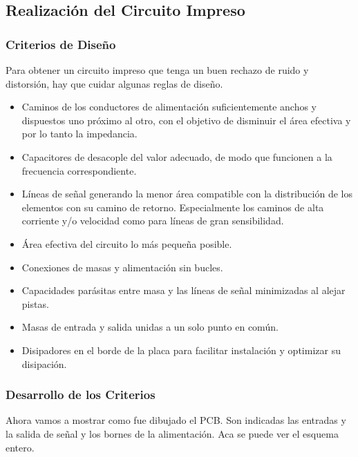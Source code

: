 \subsection{Realización del Circuito Impreso}
\bigskip 
\subsubsection{Criterios de Diseño}
Para obtener un circuito impreso que tenga un buen rechazo de ruido y distorsión, hay que cuidar algunas reglas de diseño.\\
\begin{itemize}
\bigskip 

\item  Caminos de los conductores de alimentación suficientemente anchos y  dispuestos uno próximo al otro, con el objetivo de disminuir el área efectiva y por lo tanto la impedancia.

\item Capacitores de desacople del valor adecuado, de modo que funcionen a la frecuencia correspondiente.

\item Líneas de señal generando la menor área compatible con la distribución de los elementos con su camino de retorno. Especialmente los caminos de alta corriente y/o velocidad como para líneas de gran sensibilidad.

\item Área efectiva del circuito lo más pequeña posible.

\item Conexiones de masas y alimentación sin bucles.

\item Capacidades parásitas entre masa y las líneas de señal minimizadas al alejar pistas.

\item Masas de entrada y salida unidas a un solo punto en común.

\item Disipadores en el borde de la placa para facilitar instalación y optimizar su disipación.

\end{itemize}
\subsubsection{Desarrollo de los Criterios}

Ahora vamos a mostrar como fue dibujado el PCB. Son indicadas las entradas y la salida de señal y los bornes de la alimentación. Aca se puede ver el esquema entero.\\

